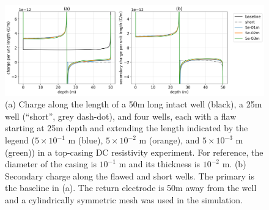 \begin{figure}
    \begin{center}
    \includegraphics[width=\textwidth]{figures/casing_charge_flawdz.png}
    \end{center}
\caption{
    (a) Charge along the length of a 50m long intact well (black),
    a 25m well (``short'', grey dash-dot), and four wells, each with a flaw
    starting at 25m depth and extending the length indicated by the legend
    ($5 \times 10^{-1}$ m (blue), $5 \times 10^{-2}$ m (orange), and $5 \times 10^{-3}$ m (green))
    in a top-casing DC resistivity experiment.
    For reference, the diameter of the casing is $10^{-1}$ m and its thickness is $10^{-2}$ m.
    (b) Secondary charge along the flawed and short wells. The primary is
    the baseline in (a). The return electrode
    is 50m away from the well and a cylindrically symmetric mesh was used in the simulation.
}
\label{fig:casing_charge_flawdz}
\end{figure}
